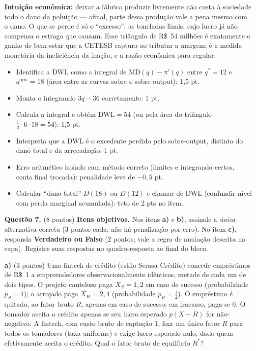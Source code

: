 \begin{solucao}
\textbf{Intuição econômica:} deixar a fábrica produzir livremente não custa à sociedade todo o dano da poluição — afinal, parte dessa produção vale a pena mesmo com o dano. O que se perde é só o ``excesso'': as toneladas finais, cujo lucro já não compensa o estrago que causam. Esse triângulo de R\$~54 milhões é exatamente o ganho de bem-estar que a CETESB captura ao tributar a margem; é a medida monetária da ineficiência da inação, e a razão econômica para regular.
\rubricalabel
\begin{itemize}
\item Identifica a DWL como a integral de $\text{MD}(q)-\pi'(q)$ entre $q^{*}=12$ e $q^{\text{priv}}=18$ (área entre as curvas sobre o sobre-output): 1{,}5 pt.
\item Monta o integrando $3q-36$ corretamente: 1 pt.
\item Calcula a integral e obtém $\text{DWL}=54$ (ou pela área do triângulo $\tfrac12\cdot 6\cdot 18=54$): 1{,}5 pt.
\item Interpreta que a DWL é o excedente perdido pelo sobre-output, distinto do dano total e da arrecadação: 1 pt.
\item Erro aritmético isolado com método correto (limites e integrando certos, conta final trocada): penalidade leve de $-0{,}5$ pt.
\item Calcular ``dano total'' $D(18)$ ou $D(12)$ e chamar de DWL (confundir nível com perda marginal acumulada): teto de 2 pts no item.
\end{itemize}
\end{solucao}



\textbf{Questão 7.} (8 pontos) \textbf{Itens objetivos.} Nos itens \textbf{a)} e \textbf{b)}, assinale a \emph{única} alternativa correta (3 pontos cada; não há penalização por erro). No item \textbf{c)}, responda \textbf{Verdadeiro ou Falso} (2 pontos; vale a regra de anulação descrita na capa). Registre suas respostas no quadro-resposta ao final do bloco.

\textbf{a)} (3 pontos) Uma fintech de crédito (estilo Serasa Crédito) concede empréstimos de R\$~1 a empreendedores observacionalmente idênticos, metade de cada um de dois tipos. O projeto cauteloso paga $X_S=1{,}2$ em caso de sucesso (probabilidade $p_S=1$); o arrojado paga $X_H=2{,}4$ (probabilidade $p_R=\tfrac12$). O empréstimo é quitado, ao fator bruto $R$, apenas em caso de sucesso; em fracasso, paga-se $0$. O tomador aceita o crédito apenas se seu lucro esperado $p(X-R)$ for não-negativo. A fintech, com custo bruto de captação $1$, fixa um único fator $R$ para todos os tomadores (taxa uniforme) e exige lucro esperado nulo, dado quem efetivamente aceita o crédito. Qual o fator bruto de equilíbrio $R^{*}$?

